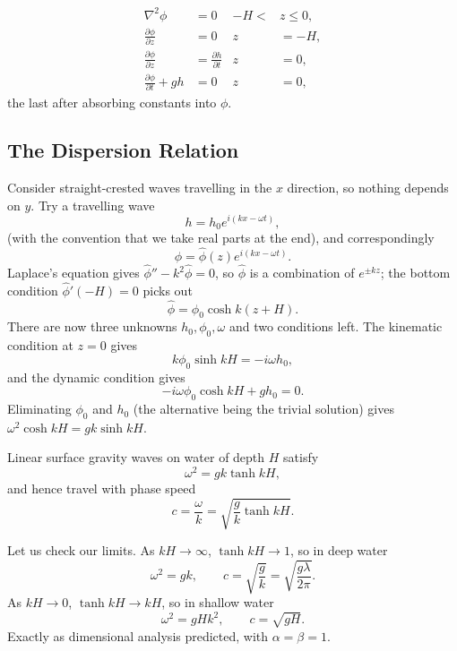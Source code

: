 \documentclass[a4paper]{scrartcl}
\newcommand{\pd}[2]{\frac{\partial #1}{\partial #2}}
\begin{document}
\begin{proposition}
	\begin{align*}
		\nabla^2 \phi &= 0 & -H < &z \le 0, \\
		\pd{\phi}{z} &= 0 & z &= -H, \\
		\pd{\phi}{z} &= \pd{h}{t} & z &= 0, \\
		\pd{\phi}{t} + gh &= 0 & z &= 0,
	\end{align*}
	the last after absorbing constants into $\phi$.
\end{proposition}

\subsection{The Dispersion Relation}

Consider straight-crested waves travelling in the $x$ direction, so nothing depends on $y$. Try a travelling wave
$$
h = h_0 e^{i(kx - \omega t)},
$$
(with the convention that we take real parts at the end), and correspondingly
$$
\phi = \hat\phi(z) e^{i(kx - \omega t)}.
$$
Laplace's equation gives $\hat\phi'' - k^2\hat\phi = 0$, so $\hat\phi$ is a combination of $e^{\pm kz}$; the bottom condition $\hat\phi'(-H) = 0$ picks out
$$
\hat\phi = \phi_0 \cosh k(z + H).
$$
There are now three unknowns $h_0, \phi_0, \omega$ and two conditions left. The kinematic condition at $z = 0$ gives
$$
k\phi_0 \sinh kH = -i\omega h_0,
$$
and the dynamic condition gives
$$
-i\omega\phi_0 \cosh kH + g h_0 = 0.
$$
Eliminating $\phi_0$ and $h_0$ (the alternative being the trivial solution) gives $\omega^2 \cosh kH = gk\sinh kH$.

\begin{theorem}
	Linear surface gravity waves on water of depth $H$ satisfy
	$$
	\omega^2 = gk\tanh kH,
	$$
	and hence travel with phase speed
	$$
	c = \frac{\omega}{k} = \sqrt{\frac{g}{k}\tanh kH}.
	$$
\end{theorem}

Let us check our limits. As $kH \to \infty$, $\tanh kH \to 1$, so in deep water
$$
\omega^2 = gk, \qquad c = \sqrt{\frac{g}{k}} = \sqrt{\frac{g\lambda}{2\pi}}.
$$
As $kH \to 0$, $\tanh kH \to kH$, so in shallow water
$$
\omega^2 = gHk^2, \qquad c = \sqrt{gH}.
$$
Exactly as dimensional analysis predicted, with $\alpha = \beta = 1$.
\end{document}
